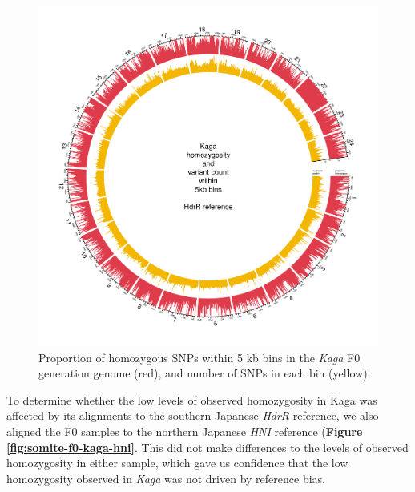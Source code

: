 \documentclass[
]{book}
\begin{document}
\begin{figure}
\includegraphics[width=1\linewidth]{figs/somites/Kaga} \caption{Proportion of homozygous SNPs within 5 kb bins in the \emph{Kaga} F0 generation genome (red), and number of SNPs in each bin (yellow).}\label{fig:somite-f0-kaga}
\end{figure}

To determine whether the low levels of observed homozygosity in Kaga was affected by its alignments to the southern Japanese \emph{HdrR} reference, we also aligned the F0 samples to the northern Japanese \emph{HNI} reference (\textbf{Figure \ref{fig:somite-f0-kaga-hni}}. This did not make differences to the levels of observed homozygosity in either sample, which gave us confidence that the low homozygosity observed in \emph{Kaga} was not driven by reference bias.
\end{document}
